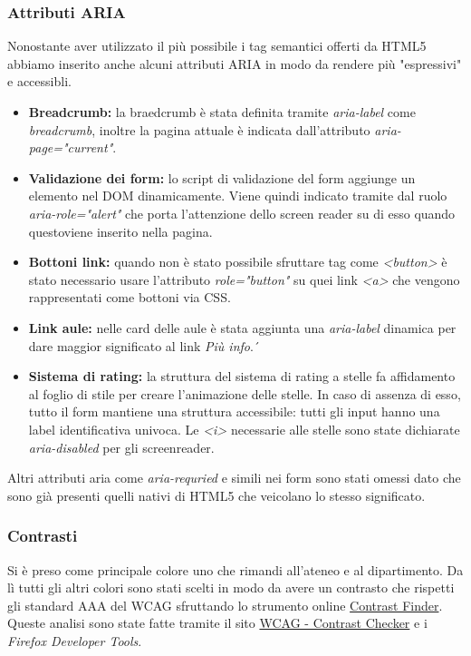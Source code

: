 \subsubsection{Attributi ARIA}
Nonostante aver utilizzato il più possibile i tag semantici offerti da HTML5 abbiamo inserito anche alcuni attributi ARIA in modo da rendere più "espressivi" e accessibli.
\begin{itemize}
    \item \textbf{Breadcrumb:} la braedcrumb è stata definita tramite \textit{aria-label} come \textit{breadcrumb}, inoltre la pagina attuale è indicata dall'attributo \textit{aria-page="current"}.
    \item \textbf{Validazione dei form:} lo script di validazione del form aggiunge un elemento nel DOM dinamicamente. Viene quindi indicato tramite dal ruolo \textit{aria-role="alert"} che porta l'attenzione dello screen reader su di esso quando questoviene inserito nella pagina.
    \item \textbf{Bottoni link:} quando non è stato possibile sfruttare tag come \textit{<button>} è stato necessario usare l'attributo \textit{role="button"} su quei link \textit{<a>} che vengono rappresentati come bottoni via CSS.
    \item \textbf{Link aule:} nelle card delle aule è stata aggiunta una \textit{aria-label} dinamica per dare maggior significato al link \textit{Più info}.´
    \item \textbf{Sistema di rating:} la struttura del sistema di rating a stelle fa affidamento al foglio di stile per creare l'animazione delle stelle. In caso di assenza di esso, tutto il form mantiene una struttura accessibile: tutti gli input hanno una label identificativa univoca. Le \textit{<i>} necessarie alle stelle sono state dichiarate \textit{aria-disabled} per gli screenreader.
\end{itemize}
Altri attributi aria come \textit{aria-requried} e simili nei form sono stati omessi dato che sono già presenti quelli nativi di HTML5 che veicolano lo stesso significato.

\subsubsection{Contrasti}
Si è preso come principale colore uno che rimandi all'ateneo e al dipartimento. Da lì tutti gli altri colori sono stati scelti in modo da avere un contrasto che rispetti gli standard AAA del WCAG sfruttando lo strumento online \href{https://app.contrast-finder.org/}{Contrast Finder}. Queste analisi sono state fatte tramite il sito \href{https://contrastchecker.com/}{WCAG - Contrast Checker} e i \textit{Firefox Developer Tools}.


